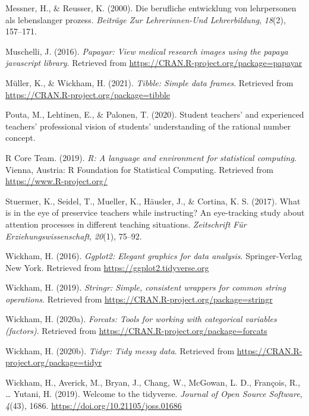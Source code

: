 \documentclass[
  english,
  man,floatsintext]{apa6}
\begin{document}
\leavevmode\hypertarget{ref-messner2000berufliche}{}%
Messner, H., \& Reusser, K. (2000). Die berufliche entwicklung von lehrpersonen als lebenslanger prozess. \emph{Beiträge Zur Lehrerinnen-Und Lehrerbildung}, \emph{18}(2), 157--171.

\leavevmode\hypertarget{ref-R-papayar}{}%
Muschelli, J. (2016). \emph{Papayar: View medical research images using the papaya javascript library}. Retrieved from \url{https://CRAN.R-project.org/package=papayar}

\leavevmode\hypertarget{ref-R-tibble}{}%
Müller, K., \& Wickham, H. (2021). \emph{Tibble: Simple data frames}. Retrieved from \url{https://CRAN.R-project.org/package=tibble}

\leavevmode\hypertarget{ref-pouta2020student}{}%
Pouta, M., Lehtinen, E., \& Palonen, T. (2020). Student teachers' and experienced teachers' professional vision of students' understanding of the rational number concept.

\leavevmode\hypertarget{ref-R-base}{}%
R Core Team. (2019). \emph{R: A language and environment for statistical computing}. Vienna, Austria: R Foundation for Statistical Computing. Retrieved from \url{https://www.R-project.org/}

\leavevmode\hypertarget{ref-stuermer2017eye}{}%
Stuermer, K., Seidel, T., Mueller, K., Häusler, J., \& Cortina, K. S. (2017). What is in the eye of preservice teachers while instructing? An eye-tracking study about attention processes in different teaching situations. \emph{Zeitschrift Für Erziehungswissenschaft}, \emph{20}(1), 75--92.

\leavevmode\hypertarget{ref-R-ggplot2}{}%
Wickham, H. (2016). \emph{Ggplot2: Elegant graphics for data analysis}. Springer-Verlag New York. Retrieved from \url{https://ggplot2.tidyverse.org}

\leavevmode\hypertarget{ref-R-stringr}{}%
Wickham, H. (2019). \emph{Stringr: Simple, consistent wrappers for common string operations}. Retrieved from \url{https://CRAN.R-project.org/package=stringr}

\leavevmode\hypertarget{ref-R-forcats}{}%
Wickham, H. (2020a). \emph{Forcats: Tools for working with categorical variables (factors)}. Retrieved from \url{https://CRAN.R-project.org/package=forcats}

\leavevmode\hypertarget{ref-R-tidyr}{}%
Wickham, H. (2020b). \emph{Tidyr: Tidy messy data}. Retrieved from \url{https://CRAN.R-project.org/package=tidyr}

\leavevmode\hypertarget{ref-R-tidyverse}{}%
Wickham, H., Averick, M., Bryan, J., Chang, W., McGowan, L. D., François, R., \ldots{} Yutani, H. (2019). Welcome to the tidyverse. \emph{Journal of Open Source Software}, \emph{4}(43), 1686. \url{https://doi.org/10.21105/joss.01686}
\end{document}
